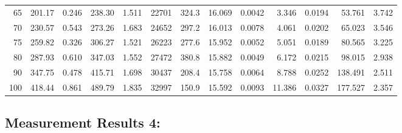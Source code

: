 \documentclass[10pt]{article}
\begin{document}
{\begin{tabular}{|r|rr|rr|rr|rr|rr|r|r|}
       65 &       201.17 &        0.246 &       238.30 &        1.511 &        22701 &        324.3 &       16.069 &       0.0042 &        3.346 &       0.0194 &       53.761 &        3.742 \\
       70 &       230.57 &        0.543 &       273.26 &        1.683 &        24652 &        297.2 &       16.013 &       0.0078 &        4.061 &       0.0202 &       65.023 &        3.546 \\
       75 &       259.82 &        0.326 &       306.27 &        1.521 &        26223 &        277.6 &       15.952 &       0.0052 &        5.051 &       0.0189 &       80.565 &        3.225 \\
       80 &       287.93 &        0.610 &       347.03 &        1.552 &        27472 &        380.8 &       15.882 &       0.0049 &        6.172 &       0.0215 &       98.015 &        2.938 \\
       90 &       347.75 &        0.478 &       415.71 &        1.698 &        30437 &        208.4 &       15.758 &       0.0064 &        8.788 &       0.0252 &      138.491 &        2.511 \\
      100 &       418.44 &        0.861 &       489.79 &        1.835 &        32997 &        150.9 &       15.592 &       0.0093 &       11.386 &       0.0327 &      177.527 &        2.357 \\
\hline
\end{tabular}
}



\subsection*{\large \bf Measurement Results 4:}
\end{document}
